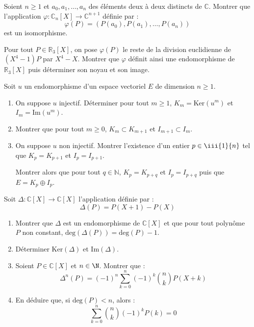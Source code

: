 \documentclass[a4paper,twoside,french,11pt]{VcCours}
\begin{document}
\begin{Exercice}{} Soient $n \geq 1$ et $a_{0} ,a_{1} , \ldots ,a_{n}$ des éléments deux à deux distincts de $\mathbb{C}$. Montrer que l'application $\varphi \colon \mathbb{C}_n[X] \rightarrow \mathbb{C}^{n+1}$ définie par :
  \[
  \varphi(P) = (P(a_{0}),P(a_{1}), \ldots ,P(a_{n}))
  \]
  est un isomorphisme.
\end{Exercice}

\begin{Exercice}[$\bigstar$] 
  Pour tout $P \in \mathbb{R}_3[X]$, on pose $\varphi(P)$ 
  le reste de la division euclidienne de $(X^4-1)P$ par $X^4-X$. 
  Montrer que $\varphi$ définit ainsi une endomorphisme de $\mathbb{R}_3[X]$ 
  puis déterminer son noyau et son image.
\end{Exercice} 



\begin{Exercice}{}
Soit $u$ un endomorphisme d'un espace vectoriel $E$ de dimension $n \geq 1$.
\begin{enumerate}
\item On suppose $u$ injectif. Déterminer pour tout $m \geq 1$, $K_m = \textrm{Ker}(u^m)$ et $I_m = \textrm{Im}(u^m)$.
\item Montrer que pour tout $m \geq 0$, $K_m \subset K_{m+1}$ et $I_{m+1} \subset I_m$.
\item On suppose $u$ non injectif. Montrer l'existence d'un entier $p \in \iii{1}{n}$ tel que $K_p=K_{p+1}$ et $I_p = I_{p+1}$.

Montrer alors que pour tout $q \in \mathbb{N}$, $K_p = K_{p+q}$ et $I_p = I_{p+q}$ puis que $E = K_p \oplus I_p$.
\end{enumerate}
\end{Exercice} 


\begin{Exercice}{} Soit $\Delta : \mathbb{C}[X] \rightarrow \mathbb{C}[X]$ l'application définie par :
  \[
  \Delta (P ) = P( X + 1 ) - P(X )
  \]
  \begin{enumerate}
  \item
    Montrer que $\Delta$ est un endomorphisme de $\mathbb{C}[X]$ et que pour tout polynôme $P$ non constant, $\textrm{deg} ( \Delta(P)) = \textrm{deg}(P) - 1$.
  \item
    Déterminer $\textrm{Ker}(\Delta)$ et $\textrm{Im}(\Delta)$.
  \item Soient $P \in \mathbb{C}[X]$ et $n \in \N$. Montrer que :
    \[
    \Delta^{n}(P) = ( - 1)^{n} \sum_{k = 0}^{n} ( - 1)^{k} \binom{n}{k}P(X + k)
    \]
  \item En déduire que, si $\textrm{deg}(P) < n$, alors :
    \[
    \sum_{k = 0}^{n} \binom{n}{k}( - 1)^{k} P(k) = 0 
    \]
  \end{enumerate}
\end{Exercice} 
\end{document}

